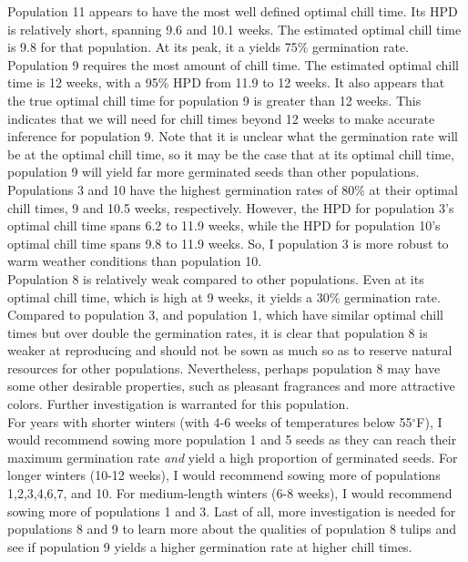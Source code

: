\documentclass[mathserif]{article}
\begin{document}
\noindent
Population 11 appears to have the most well defined optimal chill time. Its HPD
is relatively short, spanning 9.6 and 10.1 weeks. The estimated optimal chill
time is 9.8 for that population. At its peak, it a yields 75\% germination rate.\\

\noindent
Population 9 requires the most amount of chill time. The estimated optimal chill time
is 12 weeks, with a 95\% HPD from 11.9 to 12 weeks. It also appears that
the true optimal chill time for population 9 is greater than 12 weeks.
This indicates that we will need for chill times beyond 12 weeks to make
accurate inference for population 9. Note that it is unclear what the
germination rate will be at the optimal chill time, so it may be the 
case that at its optimal chill time, population 9 will yield far more 
germinated seeds than other populations.\\

\noindent
Populations 3 and 10 have the highest germination rates of 80\% at their optimal chill times,
9 and 10.5 weeks, respectively. However, the HPD for population 3's optimal chill time
spans 6.2 to 11.9 weeks, while the HPD for population 10's optimal chill time spans
9.8 to 11.9 weeks. So, I population 3 is more robust to warm weather conditions
than population 10.\\

\noindent
Population 8 is relatively weak compared to other populations. Even at its optimal chill
time, which is high at 9 weeks, it yields a 30\% germination rate. Compared to population 3,
and population 1, which have similar optimal chill times but over double the germination
rates, it is clear that population 8 is weaker at reproducing and should not be sown as much
so as to reserve natural resources for other populations. Nevertheless, perhaps population
8 may have some other desirable properties, such as pleasant fragrances and more attractive
colors. Further investigation is warranted for this population.\\

\noindent 
For years with shorter winters (with 4-6 weeks of temperatures below 55$^\circ$F), I would
recommend sowing more population 1 and 5 seeds as they can reach their maximum germination rate
\textit{and} yield a high proportion of germinated seeds. For longer winters (10-12 weeks), 
I would recommend sowing more of populations 1,2,3,4,6,7, and 10. For medium-length winters
(6-8 weeks), I would recommend sowing more of populations 1 and 3. Last of all, more investigation
is needed for populations 8 and 9 to learn more about the qualities of population 8 tulips and
see if population 9 yields a higher germination rate at higher chill times.\\
\end{document}
